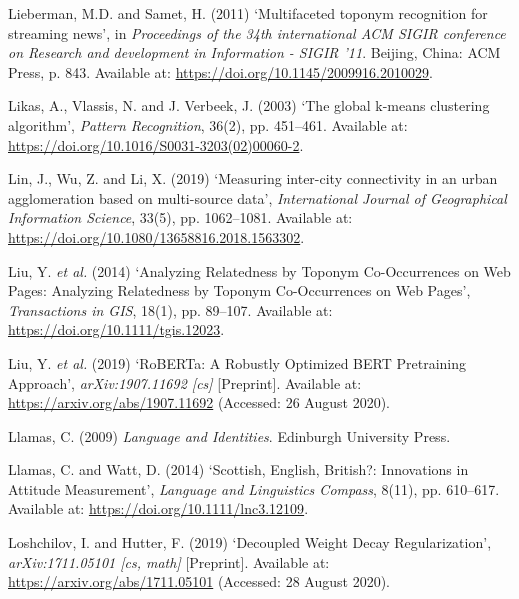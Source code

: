 \documentclass[
  letterpaper,
  11pt,
  english,
  onehalfspacing,
  headsepline]{MastersDoctoralThesis}
\newlength{\cslhangindent}
\newlength{\cslentryspacingunit} %
\newenvironment{CSLReferences}[2] %
 {%
  \setlength{\parindent}{0pt}
  \ifodd #1
  \let\oldpar\par
  \def\par{\hangindent=\cslhangindent\oldpar}
  \fi
  \setlength{\parskip}{#2\cslentryspacingunit}
 }%
 {}
\begin{document}
\begin{CSLReferences}{0}{0}
\leavevmode{}%
Lieberman, M.D. and Samet, H. (2011) {`Multifaceted toponym recognition
for streaming news'}, in \emph{Proceedings of the 34th international
{ACM SIGIR} conference on {Research} and development in {Information} -
{SIGIR} '11}. {Beijing, China}: {ACM Press}, p. 843. Available at:
\url{https://doi.org/10.1145/2009916.2010029}.

\leavevmode{}%
Likas, A., Vlassis, N. and J. Verbeek, J. (2003) {`The global k-means
clustering algorithm'}, \emph{Pattern Recognition}, 36(2), pp. 451--461.
Available at: \url{https://doi.org/10.1016/S0031-3203(02)00060-2}.

\leavevmode{}%
Lin, J., Wu, Z. and Li, X. (2019) {`Measuring inter-city connectivity in
an urban agglomeration based on multi-source data'}, \emph{International
Journal of Geographical Information Science}, 33(5), pp. 1062--1081.
Available at: \url{https://doi.org/10.1080/13658816.2018.1563302}.

\leavevmode{}%
Liu, Y. \emph{et al.} (2014) {`Analyzing {Relatedness} by {Toponym
Co-Occurrences} on {Web Pages}: {Analyzing Relatedness} by {Toponym
Co-Occurrences} on {Web Pages}'}, \emph{Transactions in GIS}, 18(1), pp.
89--107. Available at: \url{https://doi.org/10.1111/tgis.12023}.

\leavevmode{}%
Liu, Y. \emph{et al.} (2019) {`{RoBERTa}: {A Robustly Optimized BERT
Pretraining Approach}'}, \emph{arXiv:1907.11692 {[}cs{]}}
{[}Preprint{]}. Available at: \url{https://arxiv.org/abs/1907.11692}
(Accessed: 26 August 2020).

\leavevmode{}%
Llamas, C. (2009) \emph{Language and {Identities}}. {Edinburgh
University Press}.

\leavevmode{}%
Llamas, C. and Watt, D. (2014) {`Scottish, {English}, {British}?:
{Innovations} in {Attitude Measurement}'}, \emph{Language and
Linguistics Compass}, 8(11), pp. 610--617. Available at:
\url{https://doi.org/10.1111/lnc3.12109}.

\leavevmode{}%
Loshchilov, I. and Hutter, F. (2019) {`Decoupled {Weight Decay
Regularization}'}, \emph{arXiv:1711.05101 {[}cs, math{]}}
{[}Preprint{]}. Available at: \url{https://arxiv.org/abs/1711.05101}
(Accessed: 28 August 2020).


\end{CSLReferences}
\end{document}
